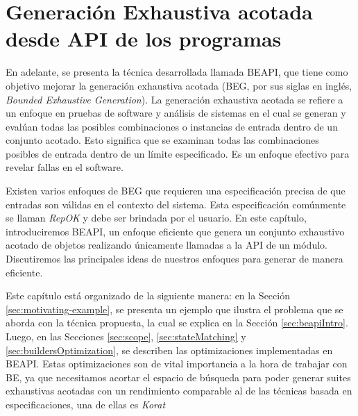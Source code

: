\chapter{Generación Exhaustiva acotada desde API de los programas}
\label{cap:beapi}

En adelante, se presenta la técnica desarrollada llamada BEAPI, que tiene como
objetivo mejorar la generación exhaustiva acotada (BEG, por sus siglas en
inglés, \emph{Bounded Exhaustive Generation}).  
La generación exhaustiva acotada se refiere a un enfoque en pruebas de software
y análisis de sistemas en el cual se generan y evalúan todas las posibles combinaciones o instancias de entrada dentro de un conjunto acotado. 
Esto significa que se examinan todas las combinaciones posibles de entrada dentro de un límite especificado. 
Es un enfoque efectivo para revelar fallas en el software. 

Existen varios enfoques de BEG que requieren una especificación precisa de que entradas son válidas en el contexto del sistema. 
Esta especificación comúnmente se llaman \emph{RepOK} y debe ser brindada por el usuario.
En este capítulo, introduciremos BEAPI, un enfoque eficiente que genera un conjunto exhaustivo acotado de objetos realizando únicamente llamadas a la API de un módulo. 
Discutiremos las principales ideas de nuestros enfoques para generar de manera eficiente. 

 
Este capítulo está organizado de la siguiente manera: en la Sección \ref{sec:motivating-example}, 
se presenta un ejemplo que ilustra el problema que se aborda con la técnica propuesta, 
la cual se explica en la Sección \ref{sec:beapiIntro}. Luego, en las Secciones \ref{sec:scope}, \ref{sec:stateMatching} y
 \ref{sec:buildersOptimization}, se describen las optimizaciones implementadas en BEAPI. 
 Estas optimizaciones son de vital importancia a la hora de trabajar con BE, 
 ya que necesitamos acortar el espacio de búsqueda para poder generar suites exhaustivas acotadas con un 
 rendimiento comparable al de las técnicas basada en especificaciones, una de ellas es \emph{Korat}\cite{Boyapati02} 


